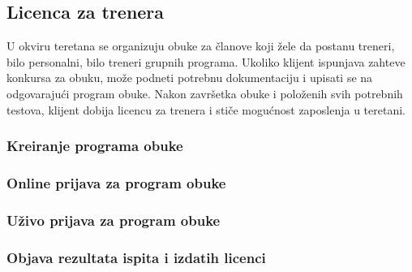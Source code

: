 \documentclass[a4paper]{article}
\begin{document}
\subsection{Licenca za trenera}

U okviru teretana se organizuju obuke za članove koji žele da postanu treneri, bilo personalni, bilo treneri grupnih programa. Ukoliko klijent ispunjava zahteve konkursa za obuku, može podneti potrebnu dokumentaciju i upisati se na odgovarajući program obuke. Nakon završetka obuke i položenih svih potrebnih testova, klijent dobija licencu za trenera i stiče mogućnost zaposlenja u teretani.

\subsubsection{Kreiranje programa obuke}


\subsubsection{Online prijava za program obuke}


\subsubsection{Uživo prijava za program obuke}


\subsubsection{Objava rezultata ispita i izdatih licenci}

\end{document}
